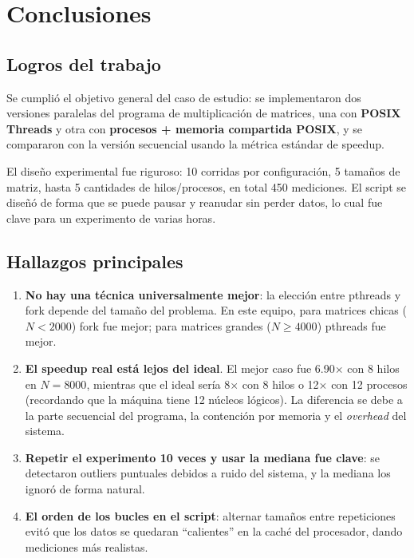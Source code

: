\section{Conclusiones}

\subsection{Logros del trabajo}

Se cumplió el objetivo general del caso de estudio: se implementaron dos versiones paralelas del programa de multiplicación de matrices, una con \textbf{POSIX Threads} y otra con \textbf{procesos + memoria compartida POSIX}, y se compararon con la versión secuencial usando la métrica estándar de speedup.

El diseño experimental fue riguroso: 10 corridas por configuración, 5 tamaños de matriz, hasta 5 cantidades de hilos/procesos, en total 450 mediciones. El script se diseñó de forma que se puede pausar y reanudar sin perder datos, lo cual fue clave para un experimento de varias horas.

\subsection{Hallazgos principales}

\begin{enumerate}
    \item \textbf{No hay una técnica universalmente mejor}: la elección entre pthreads y fork depende del tamaño del problema. En este equipo, para matrices chicas ($N < 2000$) fork fue mejor; para matrices grandes ($N \geq 4000$) pthreads fue mejor.
    \item \textbf{El speedup real está lejos del ideal}. El mejor caso fue 6.90$\times$ con 8 hilos en $N = 8000$, mientras que el ideal sería 8$\times$ con 8 hilos o 12$\times$ con 12 procesos (recordando que la máquina tiene 12 núcleos lógicos). La diferencia se debe a la parte secuencial del programa, la contención por memoria y el \textit{overhead} del sistema.
    \item \textbf{Repetir el experimento 10 veces y usar la mediana fue clave}: se detectaron outliers puntuales debidos a ruido del sistema, y la mediana los ignoró de forma natural.
    \item \textbf{El orden de los bucles en el script}: alternar tamaños entre repeticiones evitó que los datos se quedaran ``calientes'' en la caché del procesador, dando mediciones más realistas.
\end{enumerate}

